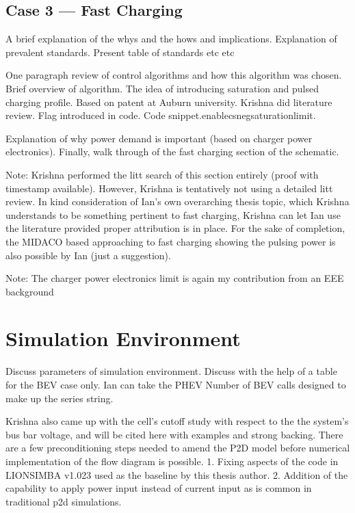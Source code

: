 \subsection{Case 3 --- Fast Charging}

A brief  explanation of the whys  and the hows and  implications. Explanation of
prevalent standards. Present table of standards etc etc

One paragraph  review of control algorithms  and how this algorithm  was chosen.
Brief  overview of  algorithm. The  idea  of introducing  saturation and  pulsed
charging profile. Based  on patent at Auburn university.  Krishna did literature
review.  Flag  introduced   in  code.  Code  snippet.enablecsnegsaturationlimit.

Explanation of why power demand is important (based on charger power electronics).
Finally, walk through of the fast charging section of the schematic.

Note: Krishna  performed the litt  search of  this section entirely  (proof with
timestamp available). However, Krishna is  tentatively not using a detailed litt
review.  In kind  consideration of  Ian's  own overarching  thesis topic,  which
Krishna understands to be something pertinent  to fast charging, Krishna can let
Ian use the literature provided proper attribution  is in place. For the sake of
completion, the  MIDACO based approaching  to fast charging showing  the pulsing
power is also possible by Ian (just a suggestion).

Note: The charger  power electronics limit is again my  contribution from an EEE
background


\section{Simulation Environment}
Discuss parameters of  simulation environment. Discuss with the help  of a table
for the  BEV case only. Ian  can take the PHEV  Number of BEV calls  designed to
make up the series string.

Krishna  also came  up with  the cell's  cutoff study  with respect  to the  the
system's  bus bar  voltage, and  will  be cited  here with  examples and  strong
backing. There  are a few  preconditioning steps needed  to amend the  P2D model
before  numerical implementation  of the  flow  diagram is  possible. 1.  Fixing
aspects of  the code  in LIONSIMBA v1.023  used as the  baseline by  this thesis
author. 2.  Addition of the capability  to apply power input  instead of current
input as is common in traditional p2d simulations.

